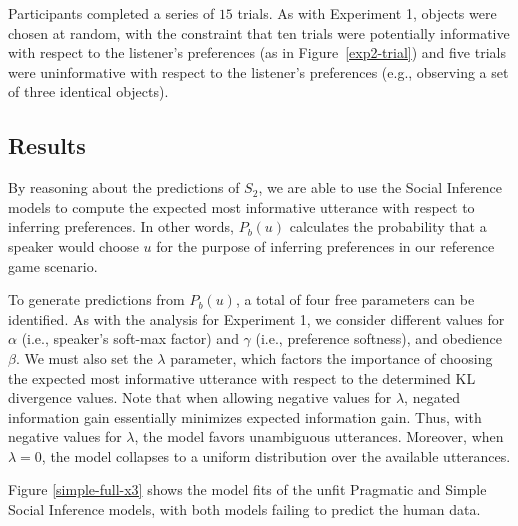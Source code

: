 \documentclass[10pt,a4paper]{article}
\newcommand{\gcs}[1]{\textcolor{blue}{[gcs: #1]}}
\begin{document}
Participants completed a series of $15$ trials. As with Experiment 1, objects were chosen at random, with the constraint that ten trials were potentially informative with respect to the listener's preferences (as in Figure~\ref{exp2-trial}) and five trials were uninformative with respect to the listener's preferences (e.g., observing a set of three identical objects).



\subsection{Results}


By reasoning about the predictions of $S_2$, we are able to use the Social Inference models to compute the expected most informative utterance with respect to inferring preferences. In other words, $P_b(u)$ calculates the probability that a speaker would choose $u$ for the purpose of inferring preferences in our reference game scenario.

To generate predictions from $P_b(u)$, a total of four free parameters can be identified. 
As with the analysis for Experiment 1, we consider different values for $\alpha$ (i.e., speaker's soft-max factor) and $\gamma$ (i.e., preference softness), and obedience $\beta$. 
We must also set the $\lambda$ parameter, which factors the importance of choosing the expected most informative utterance with respect to the determined KL divergence values.
Note that when allowing negative values for $\lambda$, negated information gain essentially minimizes expected information gain.
Thus, with negative values for $\lambda$, the model favors unambiguous utterances. 
Moreover, when $\lambda=0$, the model collapses to a uniform distribution over the available utterances.



Figure \ref{simple-full-x3} shows the model fits of the unfit Pragmatic and Simple Social Inference models, with both models failing to predict the human data.

\end{document}
